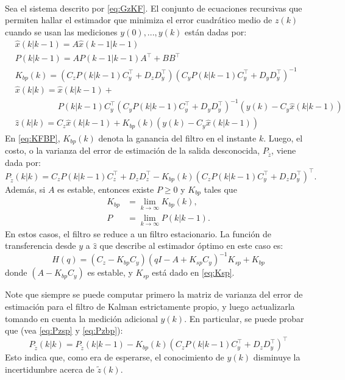 \begin{lema}\label{lema:kfbp}{\ \\}
Sea el sistema descrito por \eqref{eq:GzKF}. El conjunto de ecuaciones recursivas que permiten hallar el estimador que minimiza el error cuadr\'atico medio de $z(k)$ cuando se usan las mediciones $y(0),...,y(k)$ est\'an dadas por:
\begin{subequations}\label{eq:KFBP}
\begin{align}
&\hat{x}(k|k-1)=A\hat{x}(k-1|k-1)\\
&P(k|k-1)=AP(k-1|k-1)A^{\intercal}+BB^{\intercal}\\
&K_{bp}(k)=\left( C_zP(k|k-1)C_y^{\intercal}+D_zD_y^{\intercal}\right) \left(C_yP(k|k-1)C_y^{\intercal}+D_yD_y^{\intercal}\right)^{-1}\\ \nonumber
&\hat{x}(k|k)=\hat{x}(k|k-1)+\\ &\qquad \qquad \quad P(k|k-1)C_y^{\intercal}\left( C_yP(k|k-1)C_y^{\intercal}+D_yD_y^{\intercal}\right)^{-1}\left( y(k)-C_y\hat{x}(k|k-1)\right)\\
&\hat{z}(k|k)=C_z\hat{x}(k|k-1)+K_{bp}(k)\left(y(k)-C_y\hat{x}(k|k-1)\right)
\end{align}
\end{subequations}
En \eqref{eq:KFBP}, $K_{bp}(k)$ denota la ganancia del filtro en el instante $k$. Luego, el costo, o la varianza del error de estimaci\'on de la salida desconocida, $P_{\tilde{z}}$, viene dada por:
\begin{equation}\label{eq:Pzbp}
P_{\tilde{z}}(k|k)=C_zP(k|k-1)C_z^{\intercal}+D_zD_z^{\intercal}-K_{bp}(k)\left(C_zP(k|k-1)C_y^{\intercal}+D_zD_y^{\intercal}\right)^{\intercal}.
\end{equation}
Adem\'as, si $A$ es estable, entonces existe $P \geq 0$ y $K_{bp}$ tales que
\begin{align}
K_{bp}&=\lim_{k\rightarrow \infty}{K_{bp}(k)},\\
P&=\lim_{k\rightarrow \infty}{P(k|k-1)}.
\end{align}
En estos casos, el filtro se reduce a un filtro estacionario. La funci\'on de transferencia desde $y$ a $\hat{z}$ que describe al estimador \'optimo en este caso es:
\begin{equation}
H(q)=\left(C_z-K_{bp}C_y\right)\left( qI-A+K_{sp}C_y\right)^{-1}K_{sp}+K_{bp}
\end{equation}
donde $\left(A-K_{bp}C_y\right)$ es estable, y $K_{sp}$ est\'a dado en \eqref{eq:Ksp}.\QED
\end{lema}
\begin{obs}
Note que siempre se puede computar primero la matriz de varianza del error de estimaci\'on para el filtro de Kalman estrictamente propio, y luego actualizarla tomando en cuenta la medici\'on adicional $y(k)$. En particular, se puede probar que (vea \eqref{eq:Pzsp} y \eqref{eq:Pzbp}):
\begin{equation}
P_{\tilde{z}}(k|k)=P_{\tilde{z}}(k|k-1)-K_{bp}(k)\left( C_zP(k|k-1)C_y^{\intercal}+D_zD_y^{\intercal}\right)^{\intercal}
\end{equation}
Esto indica que, como era de esperarse, el conocimiento de $y(k)$ disminuye la incertidumbre acerca de $\tilde{z}(k)$.
\end{obs}

